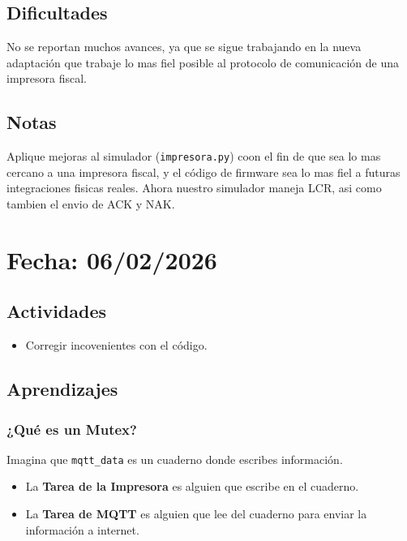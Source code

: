 \documentclass[12pt, a4paper]{article}
\begin{document}
    \subsection*{Dificultades}

    No se reportan muchos avances, ya que se sigue trabajando en la nueva adaptación que trabaje lo mas fiel posible al protocolo de comunicación de una impresora fiscal.

    \subsection*{Notas}

    Aplique mejoras al simulador (\texttt{impresora.py}) coon el fin de que sea lo mas cercano a una impresora fiscal, y el código de firmware sea lo mas fiel a futuras integraciones fisicas reales. Ahora nuestro simulador maneja LCR, asi como tambien el envio de ACK y NAK.

    \section*{Fecha: 06/02/2026}

    \subsection*{Actividades}

    \begin{itemize}
        \item Corregir incovenientes con el código.
    \end{itemize}

    \subsection*{Aprendizajes}

    {\color{red} \subsubsection*{¿Qué es un Mutex?}}
    
    Imagina que \texttt{mqtt\_data} es un cuaderno donde escribes información.

    \begin{itemize}
        \item La \textbf{Tarea de la Impresora} es alguien que escribe en el cuaderno.

        \item La \textbf{Tarea de MQTT} es alguien que lee del cuaderno para enviar la información a internet.
    \end{itemize}
    
\end{document}
